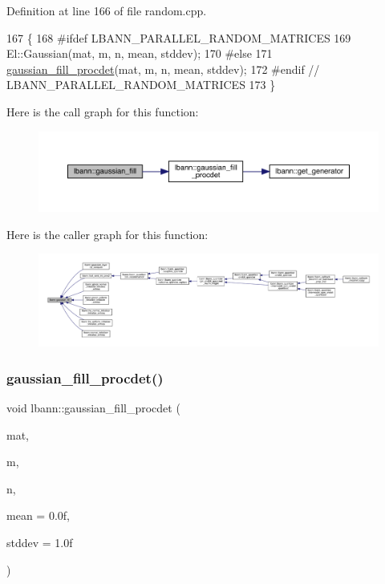 Definition at line 166 of file random.\+cpp.


\begin{DoxyCode}
167                                     \{
168 \textcolor{preprocessor}{#ifdef LBANN\_PARALLEL\_RANDOM\_MATRICES}
169   El::Gaussian(mat, m, n, mean, stddev);
170 \textcolor{preprocessor}{#else}
171   \hyperlink{namespacelbann_a2f40602f0503f9737325bb267e5c4dcc}{gaussian\_fill\_procdet}(mat, m, n, mean, stddev);
172 \textcolor{preprocessor}{#endif  // LBANN\_PARALLEL\_RANDOM\_MATRICES}
173 \}
\end{DoxyCode}
Here is the call graph for this function\+:\nopagebreak
\begin{figure}[H]
\begin{center}
\leavevmode
\includegraphics[width=350pt]{namespacelbann_abd116f95f55d0e29d9a0cc386139c4b4_cgraph}
\end{center}
\end{figure}
Here is the caller graph for this function\+:\nopagebreak
\begin{figure}[H]
\begin{center}
\leavevmode
\includegraphics[width=350pt]{namespacelbann_abd116f95f55d0e29d9a0cc386139c4b4_icgraph}
\end{center}
\end{figure}
\mbox{\label{namespacelbann_a2f40602f0503f9737325bb267e5c4dcc}} 
\subsubsection{\texorpdfstring{gaussian\+\_\+fill\+\_\+procdet()}{gaussian\_fill\_procdet()}}
{\footnotesize\ttfamily void lbann\+::gaussian\+\_\+fill\+\_\+procdet (\begin{DoxyParamCaption}\item[{\hyperlink{base_8hpp_a9a697a504ae84010e7439ffec862b470}{Abs\+Dist\+Mat} \&}]{mat,  }\item[{El\+::\+Int}]{m,  }\item[{El\+::\+Int}]{n,  }\item[{Data\+Type}]{mean = {\ttfamily 0.0f},  }\item[{Data\+Type}]{stddev = {\ttfamily 1.0f} }\end{DoxyParamCaption})}

